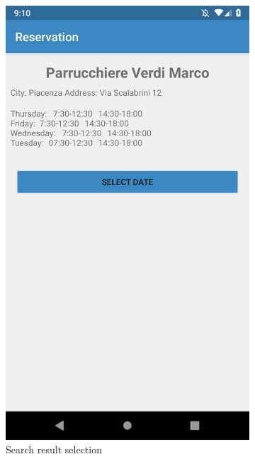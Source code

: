 \begin{figure}[h]
\centering
\begin{subfigure}{.5\textwidth}
  \centering
  \includegraphics[height=.4\textheight, keepaspectratio=true]{Img/Screens/Customer_Search_Selected}
  \caption{Search result selection}
\end{subfigure}%
\begin{subfigure}{.5\textwidth}
  \centering

\end{subfigure}
\end{figure}

